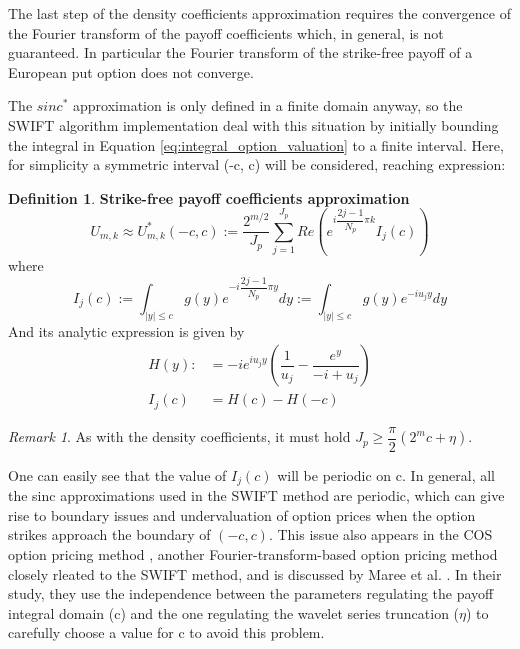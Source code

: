 \documentclass[12,twoside]{mammeTFM}
\theoremstyle{definition}
\newtheorem{definition}[thm]{Definition}
\theoremstyle{remark}
\newtheorem{remark}[thm]{Remark}
\begin{document}
The last step of the density coefficients approximation requires the convergence of the Fourier transform of the payoff coefficients which, in general, is not guaranteed. In particular the Fourier transform of the strike-free payoff of a European put option does not converge.

The $sinc^{*}$ approximation is only defined in a finite domain anyway, so the SWIFT algorithm implementation deal with this situation by initially bounding the integral in Equation \ref{eq:integral_option_valuation} to a finite interval. Here, for simplicity a symmetric interval (-c, c) will be considered, reaching expression:

\begin{definition} \textbf{Strike-free payoff coefficients approximation}
\begin{equation}
U_{m,k} \approx U_{m,k}^{*}(-c, c) := \dfrac{2^{m/2}}{J_p}\sum_{j=1}^{J_p} Re \left(e^{i \dfrac{2j - 1}{N_p} \pi k} I_{j}(c)\right)
\end{equation}
where
\begin{equation} \label{eq:strike_free_int}
I_{j}(c) := \int_{|y| \leq c} g(y) e^{-i \dfrac{2j - 1}{N_p} \pi y} dy := \int_{|y| \leq c} g(y) e^{-i u_j y} dy
\end{equation}
And its analytic expression is given by
\begin{align}
H(y) :&= -i e^{i u_j y} \left(\dfrac{1}{u_j} - \dfrac{e^y}{-i + u_j}\right) \\
I_{j}(c) &= H(c) - H(-c) 
\end{align}
\end{definition}

\begin{remark}
As with the density coefficients, it must hold $J_p \geq \dfrac{\pi}{2}(2^m c + \eta)$.
\end{remark}

One can easily see that the value of $I_j(c)$ will be periodic on c. In general, all the sinc approximations used in the SWIFT method are periodic, which can give rise to boundary issues and undervaluation of option prices when the option strikes approach the boundary of $(-c, c)$. This issue also appears in the COS option pricing method \cite{Fang2008}, another Fourier-transform-based option pricing method closely rleated to the SWIFT method, and is discussed by Maree et al. \cite{mar17}. In their study, they use the independence between the parameters regulating the payoff integral domain (c) and the one regulating the wavelet series truncation ($\eta$) to carefully choose a value for c to avoid this problem.
\end{document}
